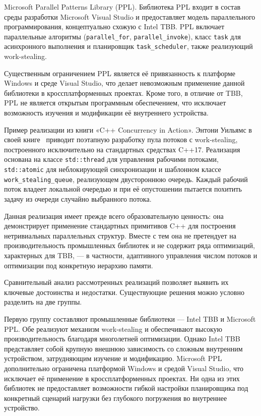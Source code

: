 Microsoft Parallel Patterns Library (PPL).
Библиотека PPL входит в состав среды разработки Microsoft Visual
Studio и предоставляет модель параллельного программирования,
концептуально схожую с Intel TBB. PPL включает параллельные
алгоритмы (\texttt{parallel\_for}, \texttt{parallel\_invoke}),
класс \texttt{task} для асинхронного выполнения и планировщик
\texttt{task\_scheduler}, также реализующий work-stealing.

Существенным ограничением PPL является её привязанность к платформе
Windows и среде Visual Studio, что делает невозможным применение
данной библиотеки в кроссплатформенных проектах. Кроме того,
в отличие от TBB, PPL не является открытым программным
обеспечением, что исключает возможность изучения и модификации
её внутреннего устройства.

Пример реализации из книги «C++ Concurrency in Action».
Энтони Уильямс в своей книге~\cite{Williams2019} приводит
поэтапную разработку пула потоков с work-stealing, построенного
исключительно на стандартных средствах C++17. Реализация
основана на классе \texttt{std::thread} для управления рабочими
потоками, \texttt{std::atomic} для неблокирующей синхронизации
и шаблонном классе \texttt{work\_stealing\_queue}, реализующем
двустороннюю очередь. Каждый рабочий поток владеет локальной
очередью и при её опустошении пытается похитить задачу из очереди
случайно выбранного потока.

Данная реализация имеет прежде всего образовательную ценность:
она демонстрирует применение стандартных примитивов C++ для
построения нетривиальных параллельных структур. Вместе с тем
она не претендует на производительность промышленных библиотек
и не содержит ряда оптимизаций, характерных для TBB, --- в частности,
адаптивного управления числом потоков и оптимизации под конкретную
иерархию памяти.

Сравнительный анализ рассмотренных реализаций позволяет выявить
их ключевые достоинства и недостатки. Существующие решения можно
условно разделить на две группы.

Первую группу составляют промышленные библиотеки --- Intel TBB
и Microsoft PPL. Обе реализуют механизм work-stealing и обеспечивают
высокую производительность благодаря многолетней оптимизации.
Однако Intel TBB представляет собой крупную внешнюю зависимость
со сложным внутренним устройством, затрудняющим изучение и
модификацию. Microsoft PPL дополнительно ограничена платформой
Windows и средой Visual Studio, что исключает её применение
в кроссплатформенных проектах. Ни одна из этих библиотек не
предоставляет возможности гибкой настройки планировщика под
конкретный сценарий нагрузки без глубокого погружения во внутреннее
устройство.

